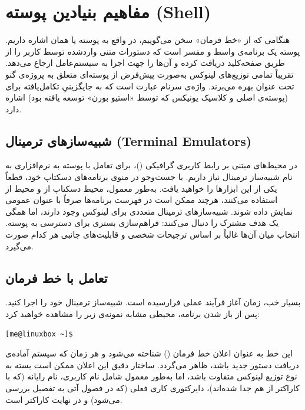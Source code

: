 \chapter{مفاهیم بنیادین پوسته (Shell)}

هنگامی که از «خط فرمان» سخن می‌گوییم، در واقع به پوسته یا همان  اشاره داریم. پوسته یک برنامه‌ی واسط و مفسر است که دستورات متنی واردشده توسط کاربر را از طریق صفحه‌کلید دریافت کرده و آن‌ها را جهت اجرا به سیستم‌عامل ارجاع می‌دهد. تقریباً تمامی توزیع‌های لینوکس به‌صورت پیش‌فرض از پوسته‌ای متعلق به پروژه‌ی گنو تحت عنوان  بهره می‌برند. واژه‌ی  سرنام عبارت  است که به جایگزینیِ تکامل‌یافته برای  (پوسته‌ی اصلی و کلاسیک یونیکس که توسط «استیو بورن» توسعه یافته بود) اشاره دارد.

\section{شبیه‌سازهای ترمینال (Terminal Emulators)}

در محیط‌های مبتنی بر رابط کاربری گرافیکی ()، برای تعامل با پوسته به نرم‌افزاری به نام شبیه‌ساز ترمینال نیاز داریم. با جست‌وجو در منوی برنامه‌های دسکتاپ خود، قطعاً یکی از این ابزارها را خواهید یافت. به‌طور معمول، محیط دسکتاپ  از  و محیط  از  استفاده می‌کنند، هرچند ممکن است در فهرست برنامه‌ها صرفاً با عنوان عمومی  نمایش داده شوند. شبیه‌سازهای ترمینال متعددی برای لینوکس وجود دارند، اما همگی یک هدف مشترک را دنبال می‌کنند: فراهم‌سازی بستری برای دسترسی به پوسته. انتخاب میان آن‌ها غالباً بر اساس ترجیحات شخصی و قابلیت‌های جانبی هر کدام صورت می‌گیرد.

\section{تعامل با خط فرمان}

بسیار خب، زمان آغاز فرآیند عملی فرارسیده است. شبیه‌ساز ترمینال خود را اجرا کنید. پس از باز شدن برنامه، محیطی مشابه نمونه‌ی زیر را مشاهده خواهید کرد:

\begin{latin}
\begin{lstlisting}
[me@linuxbox ~]$
\end{lstlisting}
\end{latin}

این خط به عنوان اعلان خط فرمان () شناخته می‌شود و هر زمان که سیستم آماده‌ی دریافت دستور جدید باشد، ظاهر می‌گردد. ساختار دقیق این اعلان ممکن است بسته به نوع توزیع لینوکس متفاوت باشد، اما به‌طور معمول شامل نام کاربری، نام رایانه (که با کاراکتر  از هم جدا شده‌اند)، دایرکتوری کاری فعلی (که در فصول آتی به تفصیل بررسی می‌شود) و در نهایت کاراکتر \cmd{\$} است.

